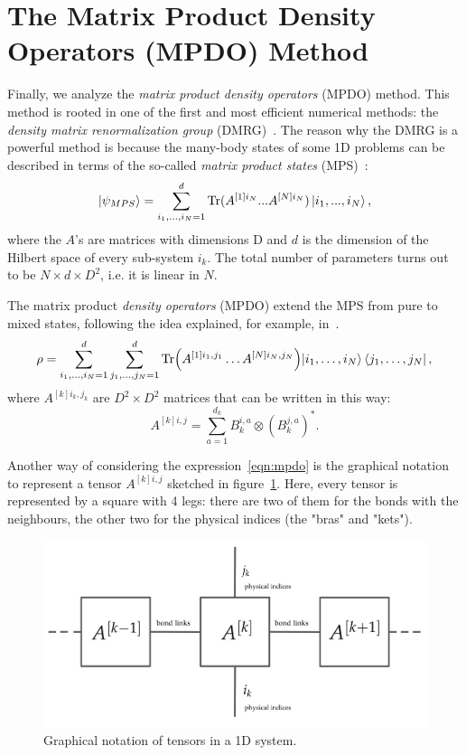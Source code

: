 \section{The Matrix Product Density Operators (MPDO) Method}
Finally, we analyze the \emph{matrix product density operators} (MPDO) method.
This method is rooted in one of the first and most efficient numerical methods: the \emph{density matrix renormalization group} (DMRG)~\cite{s_white:dmrg}. The reason why the DMRG is a powerful method is because the many-body states of some 1D problems can be described in terms of the so-called \emph{matrix product states} (MPS)~\cite{PhysRevLett.93.207204, PhysRevLett:from_dmrg_to_mps}:
\begin{equation}
    \ket{\psi_{MPS}} = \sum_{i_1, ..., i_N = 1}^{d} \operatorname{Tr}(A^{[1]i_N}...A^{[N]i_N}) \ket{i_1,...,i_N},
\end{equation}
where the $A$'s are matrices with dimensions D and $d$ is the dimension of the Hilbert space of every sub-system $i_k$. The total number of parameters turns out to be $N \times d \times D^2$, i.e. it is linear in $N$.

The matrix product \emph{density operators} (MPDO) extend the MPS from pure to mixed states, following the idea explained, for example, in~\cite{PhysRevLett.93.207204}. 
\begin{equation}
\label{eqn:mpdo}
    \rho = \sum_{i_1, \dots ,i_N = 1}^{d} \sum_{j_1, \dots ,j_N = 1}^{d} \operatorname{Tr}\Bigl(A^{[1]i_1,j_1} \dots A^{[N]i_N,j_N}\Bigl) \ket{i_1, \dots ,i_N}\bra{j_1, \dots ,j_N},
\end{equation}
where $A^{[k]i_k,j_k}$ are $D^2 \times D^2$ matrices that can be written in this way:
\begin{equation}
    A^{[k] i,j} = \sum_{a = 1}^{d_k} B_k^{i,a} \otimes (B_k^{j,a})^*.
\end{equation}

Another way of considering the expression~\ref{eqn:mpdo} is the graphical notation to represent a tensor $A^{[k] i,j}$ sketched in figure~\ref{fig:tensor_network}. Here, every tensor is represented by a square with 4 legs: there are two of them for the bonds with the neighbours, the other two for the physical indices (the "bras" and "kets"). 

\begin{figure}[H]
    \centering
    \includegraphics[scale=0.30]{Figures/tensor_network.png}
    \caption{Graphical notation of tensors in a 1D system.}
    \label{fig:tensor_network}
\end{figure}

